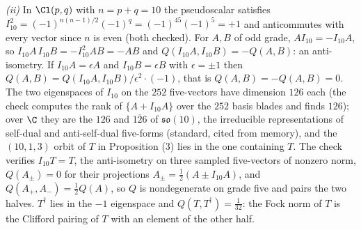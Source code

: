 \emph{(ii)} In $\Cl(p,q)$ with $n = p + q = 10$ the pseudoscalar satisfies $I_{10}^{2} = (-1)^{n(n-1)/2}(-1)^{q} = (-1)^{45}(-1)^{5} = +1$ and anticommutes with every vector since $n$ is even (both checked). For $A, B$ of odd grade, $AI_{10} = -I_{10}A$, so $I_{10}A\,I_{10}B = -I_{10}^{2}AB = -AB$ and $Q(I_{10}A, I_{10}B) = -Q(A, B)$: an anti-isometry. If $I_{10}A = \epsilon A$ and $I_{10}B = \epsilon B$ with $\epsilon = \pm1$ then $Q(A, B) = Q(I_{10}A, I_{10}B)/\epsilon^{2}\cdot(-1)$, that is $Q(A, B) = -Q(A, B) = 0$. The two eigenspaces of $I_{10}$ on the $252$ five-vectors have dimension $126$ each (the check computes the rank of $\{A + I_{10}A\}$ over the $252$ basis blades and finds $126$); over $\C$ they are the $126$ and $\overline{126}$ of $\mathfrak{so}(10)$, the irreducible representations of self-dual and anti-self-dual five-forms (standard, cited from memory), and the $(10,1,3)$ orbit of $T$ in Proposition (3) lies in the one containing $T$. The check verifies $I_{10}T = T$, the anti-isometry on three sampled five-vectors of nonzero norm, $Q(A_{\pm}) = 0$ for their projections $A_{\pm} = \tfrac12(A \pm I_{10}A)$, and $Q(A_{+}, A_{-}) = \tfrac12 Q(A)$, so $Q$ is nondegenerate on grade five and pairs the two halves. $T^{\dagger}$ lies in the $-1$ eigenspace and $Q(T, T^{\dagger}) = \tfrac{1}{32}$: the Fock norm of $T$ is the Clifford pairing of $T$ with an element of the other half.

